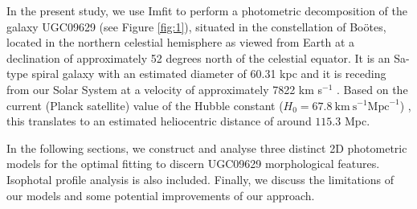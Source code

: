 %

In the present study, we use Imfit to perform a photometric decomposition of the galaxy UGC09629 (see Figure \ref{fig:1}), situated in the constellation of Boötes, located in the northern celestial hemisphere as viewed from Earth at a declination of approximately 52 degrees north of the celestial equator. It is an Sa-type spiral galaxy with an estimated diameter of 60.31 kpc and it is receding from our Solar System at a velocity of approximately 7822 km s$^{-1}$ \citep{ned}. Based on the current (Planck satellite) value of the Hubble constant ($H_0=67.8 \ \text{km} \ \text{s}^{-1} \text{Mpc}^{-1}$) \citep{aghanim2020planck}, this translates to an estimated heliocentric distance of around $115.3$ Mpc. 

In the following sections, we construct and analyse three distinct 2D photometric models for the optimal fitting to discern UGC09629 morphological features. Isophotal profile analysis is also included. Finally, we discuss the limitations of our models and some potential improvements of our approach.




